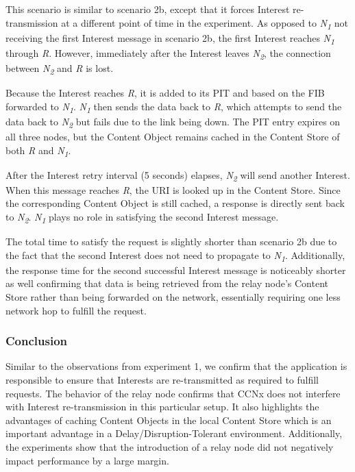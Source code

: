 \documentclass[a4paper,12pt]{report}      %
\begin{document}
This scenario is similar to scenario 2b, except that it forces Interest re-transmission at a different
point of time in the experiment. As opposed to \emph{N\textsubscript{1}} not receiving the first Interest message
in scenario 2b, the first Interest reaches \emph{N\textsubscript{1}} through \emph{R}. However, immediately after the
Interest leaves \emph{N\textsubscript{2}}, the connection between \emph{N\textsubscript{2}} and \emph{R} is lost.

Because the Interest reaches \emph{R}, it is added to its PIT and based on the FIB forwarded to \emph{N\textsubscript{1}}.
\emph{N\textsubscript{1}} then sends the data back to \emph{R}, which attempts to send the data back to \emph{N\textsubscript{2}} but
fails due to the link being down. The PIT entry expires on all three nodes, but the Content Object
remains cached in the Content Store of both \emph{R} and \emph{N\textsubscript{1}}.

After the Interest retry interval (5 seconds) elapses, \emph{N\textsubscript{2}} will send another Interest. When this
message reaches \emph{R}, the URI is looked up in the Content Store. Since the corresponding Content
Object is still cached, a response is directly sent back to \emph{N\textsubscript{2}}. \emph{N\textsubscript{1}} plays no
 role in satisfying the second Interest message.

The total time to satisfy the request is slightly shorter than scenario 2b due to the fact that the second
Interest does not need to propagate to \emph{N\textsubscript{1}}. Additionally, the response time for
the second successful Interest message is noticeably shorter as well confirming that data is being
retrieved from the relay node's Content Store rather than being forwarded on the network, essentially requiring one
less network hop to fulfill the request.

\subsubsection{Conclusion}

Similar to the observations from experiment 1, we confirm that the application is responsible to ensure that Interests are
re-transmitted as required to fulfill requests. The behavior of the relay node confirms that CCNx does not interfere with Interest re-transmission in this particular setup. It also highlights the advantages of caching Content Objects
in the local Content Store which is an important advantage in a Delay/Disruption-Tolerant environment.
Additionally, the experiments show that the introduction of a relay node did not negatively impact performance by a large margin.
\end{document}
